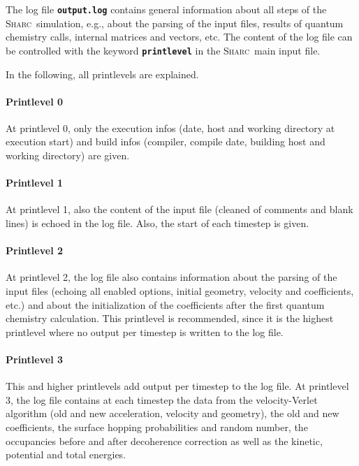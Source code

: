 \documentclass[a4paper,11pt,DIV=15,openany,twoside=false]{scrbook}
\newcommand{\sharc}{\textsc{Sharc}}
\newcommand{\ttt}[1]{\textbf{\texttt{#1}}}
\begin{document}
The log file \ttt{output.log} contains general information about all steps of the \sharc\ simulation, e.g., about the parsing of the input files, results of quantum chemistry calls, internal matrices and vectors, etc. The content of the log file can be controlled with the keyword \ttt{printlevel} in the \sharc\ main input file.

In the following, all printlevels are explained.

\paragraph{Printlevel 0}

At printlevel 0, only the execution infos (date, host and working directory at execution start) and build infos (compiler, compile date, building host and working directory) are given.

\paragraph{Printlevel 1}

At printlevel 1, also the content of the input file (cleaned of comments and blank lines) is echoed in the log file. Also, the start of each timestep is given.

\paragraph{Printlevel 2}

At printlevel 2, the log file also contains information about the parsing of the input files (echoing all enabled options, initial geometry, velocity and coefficients, etc.) and about the initialization of the coefficients after the first quantum chemistry calculation. This printlevel is recommended, since it is the highest printlevel where no output per timestep is written to the log file.

\paragraph{Printlevel 3}

This and higher printlevels add output per timestep to the log file. At printlevel 3, the log file contains at each timestep the data from the velocity-Verlet algorithm (old and new acceleration, velocity and geometry), the old and new coefficients, the surface hopping probabilities and random number, the occupancies before and after decoherence correction as well as the kinetic, potential and total energies.
\end{document}
